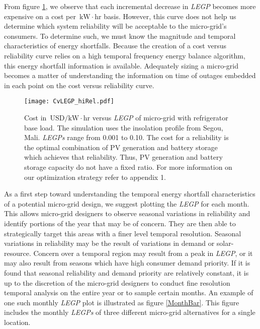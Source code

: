 \documentclass[11p]{article}
\newcommand{\unit}[1]{\ensuremath{\, \mathrm{#1}}}
\begin{document}
From figure \ref{CVsLEGP}, we observe that each incremental decrease in \emph{LEGP} becomes more expensive on a cost per \unit{kW\! \cdot \! hr} basis.
However, this curve does not help us determine which system reliability will be acceptable to the micro-grid's consumers.
To determine such, we must know the magnitude and temporal characteristics of energy shortfalls. 
Because the creation of a cost versus reliability curve relies on a high temporal frequency energy balance algorithm, this energy shortfall information is available. 
Adequately sizing a micro-grid becomes a matter of understanding the information on time of outages embedded in each point on the cost versus reliability curve. 


\begin{figure}[ht] 
  \centering
    \texttt{[image: CvLEGP\_hiRel.pdf]}
  \caption{Cost in \unit{USD/kW\! \cdot \! hr} versus \emph{LEGP} of 
micro-grid with refrigerator base load.
The simulation uses the insolation profile from Segou, Mali.
\emph{LEGPs} range from 0.001 to 0.10.
The cost for a reliability is the optimal combination of PV generation and battery storage which achieves that reliability.
Thus, PV generation and battery storage capacity do not have a fixed ratio. 
For more information on our optimization strategy refer to appendix 1.}
\label{CVsLEGP}
\end{figure}


As a first step toward understanding the temporal energy shortfall characteristics of a potential micro-grid design, we suggest plotting the \emph{LEGP} for each month. 
This allows micro-grid designers to observe seasonal variations in reliability and identify portions of the year that may be of concern.
They are then able to strategically target this areas with a finer level temporal resolution.
Seasonal variations in reliability may be the result of variations in demand or solar-resource.
Concern over a temporal region may result from a peak in \emph{LEGP}, or it may also result from seasons which have high consumer demand priority.
If it is found that seasonal reliability and demand priority are relatively 	
constant, it is up to the discretion of the micro-grid designers to 
conduct fine resolution temporal analysis on the entire year or to sample certain months.
An example of one such monthly \emph{LEGP} plot is illustrated as figure \ref{MonthBar}. 
This figure includes the monthly \emph{LEGPs} of three different micro-grid alternatives for a single location.
	
\end{document}
